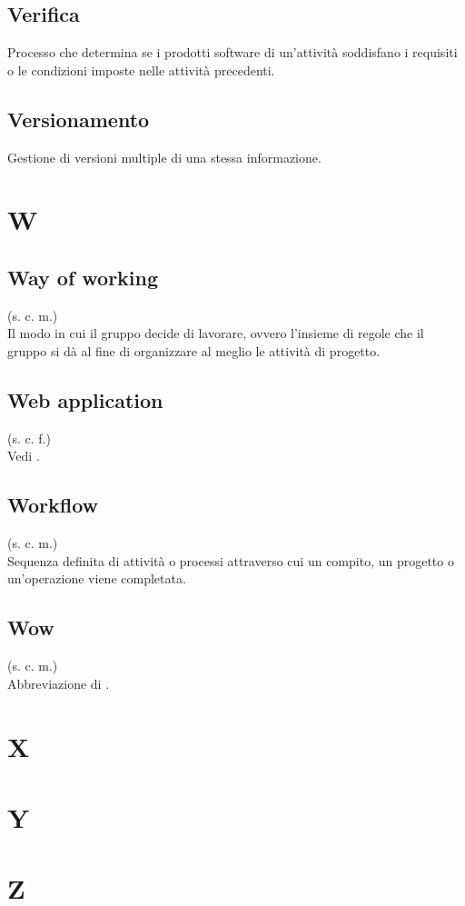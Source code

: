     \subsection{Verifica}
    Processo che determina se i prodotti software di un'attività soddisfano
    i requisiti o le condizioni imposte nelle attività precedenti.
    \subsection{Versionamento}
    Gestione di versioni multiple di una stessa informazione.
\pagebreak
\section{W}
    \subsection{Way of working}
    \label{Way of working}
    (s. c. m.)\\
    Il modo in cui il gruppo decide di lavorare, ovvero l'insieme di regole 
    che il gruppo si dà al fine di organizzare al meglio le attività di progetto.
    \subsection{Web application}
    (s. c. f.)\\
    Vedi .
    \subsection{Workflow}
    (s. c. m.)\\
    Sequenza definita di attività o processi attraverso cui un compito, un progetto 
    o un'operazione viene completata.
    \subsection{Wow}
    (s. c. m.)\\
    Abbreviazione di .
\pagebreak
\section{X}
\pagebreak
\section{Y}
\pagebreak
\section{Z}
